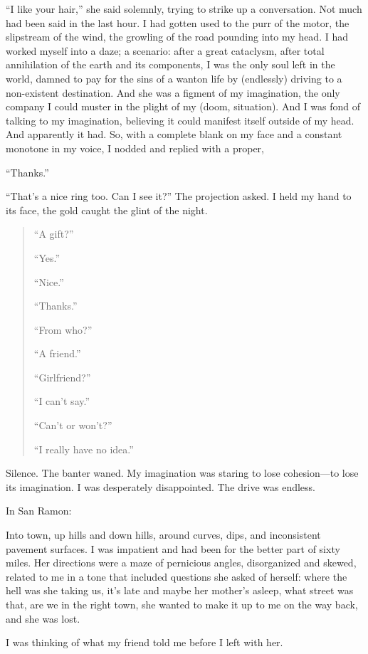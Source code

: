 ``I like your hair,'' she said solemnly, trying to strike up a
conversation. Not much had been said in the last hour. I had gotten used
to the purr of the motor, the slipstream of the wind, the growling of
the road pounding into my head. I had worked myself into a daze; a
scenario: after a great cataclysm, after total annihilation of the earth
and its components, I was the only soul left in the world, damned to pay
for the sins of a wanton life by (endlessly) driving to a non-existent
destination. And she was a figment of my imagination, the only company I
could muster in the plight of my (doom, situation). And I was fond of
talking to my imagination, believing it could manifest itself outside of
my head. And apparently it had. So, with a complete blank on my face and
a constant monotone in my voice, I nodded and replied with a proper,

``Thanks.''

``That's a nice ring too. Can I see it?'' The projection asked. I held
my hand to its face, the gold caught the glint of the night.

\begin{quote}
``A gift?''

``Yes.''

``Nice.''

``Thanks.''

``From who?''

``A friend.''

``Girlfriend?''

``I can't say.''

``Can't or won't?''

``I really have no idea.''
\end{quote}

Silence. The banter waned. My imagination was staring to lose
cohesion---to lose its imagination. I was desperately disappointed. The
drive was endless.

In San Ramon:

Into town, up hills and down hills, around curves, dips, and
inconsistent pavement surfaces. I was impatient and had been for the
better part of sixty miles. Her directions were a maze of pernicious
angles, disorganized and skewed, related to me in a tone that included
questions she asked of herself: where the hell was she taking us, it's
late and maybe her mother's asleep, what street was that, are we in the
right town, she wanted to make it up to me on the way back, and she was
lost.

I was thinking of what my friend told me before I left with her.

